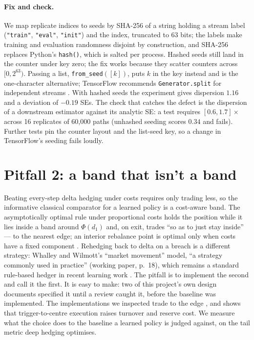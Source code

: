 \documentclass{article}
\newcommand{\fromseed}{\texttt{from\_seed}}
\begin{document}
\paragraph{Fix and check.} We map replicate indices to seeds by SHA-256 of a string holding a
stream label (\texttt{"train"}, \texttt{"eval"}, \texttt{"init"}) and the index, truncated to 63
bits; the labels make training and evaluation randomness disjoint by construction, and SHA-256
replaces Python's \texttt{hash()}, which is salted per process. Hashed seeds still land in the
counter under key zero; the fix works because they scatter counters across $[0, 2^{63})$. Passing
a list, \fromseed{}$([k])$, puts $k$ in the key instead and is the one-character alternative;
TensorFlow recommends \texttt{Generator.split} for independent streams
\citep{tensorflow2024guide}. With hashed seeds the experiment gives dispersion $1.16$ and a
deviation of $-0.19$ SEs. The check that catches the defect is the dispersion of a downstream
estimator against its analytic SE: a test requires $[0.6, 1.7]\times$ across 16 replicates of
60{,}000 paths (unhashed seeding scores $0.34$ and fails). Further tests pin the counter layout
and the list-seed key, so a change in TensorFlow's seeding fails loudly.

\section{Pitfall 2: a band that isn't a band}\label{sec:band}

Beating every-step delta hedging under costs requires only trading less, so the informative
classical comparator for a learned policy is a cost-aware band. The asymptotically optimal rule
under proportional costs holds the position while it lies inside a band around $\Phi(d_1)$ and,
on exit, trades ``so as to just stay inside'' \citep[working paper, p.~6]{whalley1997asymptotic}
--- to the nearest edge; an interior rebalance point is optimal only when costs have a fixed
component \citep{whalley1999best}. Rehedging back to delta on a breach is a different strategy:
Whalley and Wilmott's ``market movement'' model, ``a strategy commonly used in practice''
(working paper, p.~18), which remains a standard rule-based hedger in recent learning work
\citep{chen2025ophr}. The pitfall is to implement the second and call it the first. It is easy to
make: two of this project's own design documents specified it until a review caught it, before
the baseline was implemented. The implementations we inspected trade to the edge
\citep{imaki2023ntb,kumar2026deep,sakuma2026robust}, and \citet[App.~E]{sakuma2026robust} shows
that trigger-to-centre execution raises turnover and reserve cost. We measure what the choice does
to the baseline a learned policy is judged against, on the tail metric deep hedging optimises.
\end{document}
